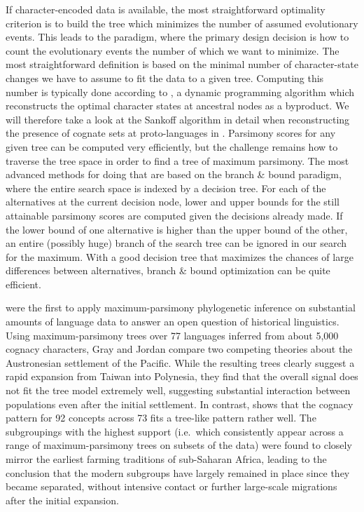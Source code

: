 If character-encoded data is available, the most straightforward optimality criterion is to build the tree which minimizes the number of assumed evolutionary events. This leads to the \textit{} paradigm, where the primary design decision is how to count the evolutionary events the number of which we want to minimize. The most straightforward definition is based on the minimal number of character-state changes we have to assume to fit the data to a given tree. Computing this number is typically done according to \citet{sankoff1975}, a dynamic programming algorithm which reconstructs the optimal character states at ancestral nodes as a byproduct. We will therefore take a look at the Sankoff algorithm in detail when reconstructing the presence of cognate sets at proto-languages in . Parsimony scores for any given tree can be computed very efficiently, but the challenge remains how to traverse the tree space in order to find a tree of maximum parsimony. The most advanced methods 
for doing that are based on the branch \& bound paradigm, where the entire search space is indexed by a decision tree. For each of the alternatives at the current decision node, lower and upper bounds for the still attainable parsimony scores are computed given the decisions already made. If the lower bound of one alternative is higher than the upper bound of the other, an entire (possibly huge) branch of the search tree can be ignored in our search for the maximum. With a good decision tree that maximizes the chances of large differences between alternatives, branch \& bound optimization can be quite efficient.

\citet{gray_jordan_2000} were the first to apply maximum-parsimony phylogenetic inference on substantial amounts of language data to answer an open question of historical linguistics. Using maximum-parsimony trees over 77 languages inferred from about 5,000 cognacy characters, Gray and Jordan compare two competing theories about the Austronesian settlement of the Pacific. While the resulting trees clearly suggest a rapid expansion from Taiwan into Polynesia, they find that the overall signal does not fit the tree model extremely well, suggesting substantial interaction between populations even after the initial settlement. In contrast, \citet{holden2002} shows that the cognacy pattern for 92 concepts across 73  fits a tree-like pattern rather well. The subgroupings with the highest support (i.e.\ which consistently appear across a range of maximum-parsimony trees on subsets of the data) were found to closely mirror the earliest farming traditions of sub-Saharan Africa, leading to the conclusion that the modern subgroups have largely remained in place since they became separated, without intensive contact or further large-scale migrations after the initial expansion.

